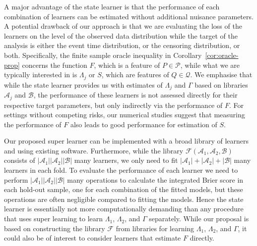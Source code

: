 \documentclass[11pt]{article}
\theoremstyle{thmstyleone}%
\theoremstyle{thmstyletwo}%
\theoremstyle{thmstylethree}%
\newcommand{\1}{\mathds{1}}
\begin{document}
A major advantage of the state learner is that the performance of each
combination of learners can be estimated without additional nuisance
parameters. A potential drawback of our approach is that we are
evaluating the loss of the learners on the level of the observed data
distribution while the target of the analysis is either the event time
distribution, or the censoring distribution, or both.
Specifically, the finite sample oracle inequality in
Corollary~\ref{cor:oracle-prop} concerns the function \( F \), which
is a feature of \( P \in \mathcal{P} \), while what we are typically
interested in is \( \Lambda_j \) or \( S \), which are features of
\( Q \in \mathcal{Q} \). We emphasise that while the state learner
provides us with estimates of \( \Lambda_j \) and $\Gamma$ based on
libraries \( \mathcal{A}_j \) and \( \mathcal{B} \), the performance
of these learners is not assessed directly for their respective target
parameters, but only indirectly via the performance of \( F \).  For
settings without competing risks, our numerical studies suggest that
measuring the performance of \( F \) also leads to good performance
for estimation of \( S \).


Our proposed super learner can be implemented with a broad library of learners
and using existing software.
Furthermore, while
the library \( \mathcal{F}(\mathcal{A}_1,\mathcal{A}_2,\mathcal{B}) \) consists
of \( |\mathcal{A}_1||\mathcal{A}_2||\mathcal{B}| \) many learners, we only need to fit
\( |\mathcal{A}_1| +|\mathcal{A}_2| + |\mathcal{B}| \) many learners in each fold. To
evaluate the performance of each learner we need to perform
\( |\mathcal{A}_1||\mathcal{A}_2||\mathcal{B}| \) many operations to calculate the
integrated Brier score in each hold-out sample, one for each combination of the
fitted models, but these operations are often negligible compared to fitting the
models. Hence the state learner is essentially not more computationally demanding
than any procedure that uses super learning to learn $\Lambda_1$, $\Lambda_2$,
and $\Gamma$ separately. While our proposal is based on constructing the library
\( \mathcal{F} \) from libraries for learning \( \Lambda_1 \), $\Lambda_2$, and
$\Gamma$, it could also be of interest to consider learners that estimate
\( F \) directly.
\end{document}
